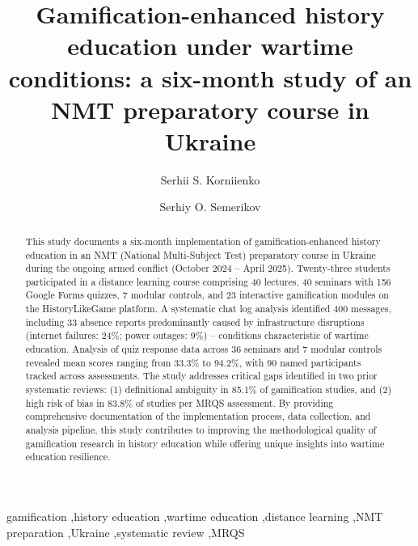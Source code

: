 \documentclass[review]{elsarticle}
\begin{document}
\begin{frontmatter}

\title{Gamification-enhanced history education under wartime conditions: a six-month study of an NMT preparatory course in Ukraine}

\author[kdpu]{Serhii S. Korniienko}

\author[kdpu]{Serhiy O. Semerikov}

\address[kdpu]{Kryvyi Rih State Pedagogical University, 54 Gagarin Ave, Kryvyi Rih, 50086, Ukraine}

\begin{abstract}
This study documents a six-month implementation of gamification-enhanced history education in an NMT (National Multi-Subject Test) preparatory course in Ukraine during the ongoing armed conflict (October 2024 -- April 2025). Twenty-three students participated in a distance learning course comprising 40 lectures, 40 seminars with 156 Google Forms quizzes, 7 modular controls, and 23 interactive gamification modules on the HistoryLikeGame platform. A systematic chat log analysis identified 400 messages, including 33 absence reports predominantly caused by infrastructure disruptions (internet failures: 24\%; power outages: 9\%) -- conditions characteristic of wartime education. Analysis of quiz response data across 36 seminars and 7 modular controls revealed mean scores ranging from 33.3\% to 94.2\%, with 90 named participants tracked across assessments. The study addresses critical gaps identified in two prior systematic reviews: (1) definitional ambiguity in 85.1\% of gamification studies, and (2) high risk of bias in 83.8\% of studies per MRQS assessment. By providing comprehensive documentation of the implementation process, data collection, and analysis pipeline, this study contributes to improving the methodological quality of gamification research in history education while offering unique insights into wartime education resilience.
\end{abstract}

\begin{keyword}
gamification \sep history education \sep wartime education \sep distance learning \sep NMT preparation \sep Ukraine \sep systematic review \sep MRQS
\end{keyword}

\end{frontmatter}

\linenumbers
\end{document}
